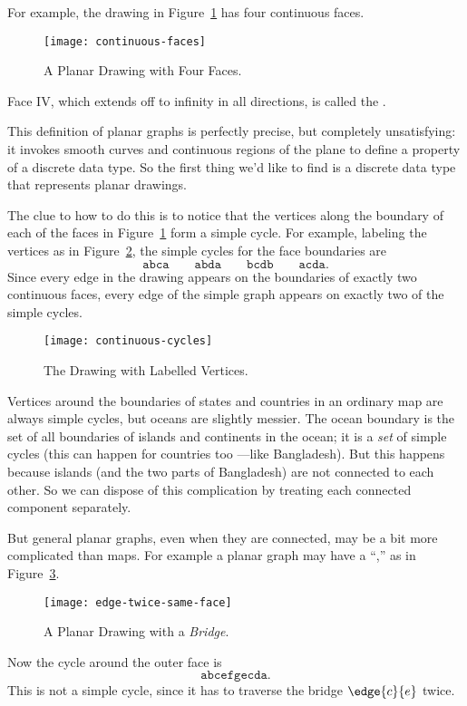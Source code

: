 For example, the drawing in Figure~\ref{fig:continuous-faces} has four
continuous faces.
\begin{figure}[h]
\centering \texttt{[image: continuous-faces]}
\caption{A Planar Drawing with Four Faces.}
\label{fig:continuous-faces}
\end{figure}
Face IV, which extends off to infinity in all directions, is called the
.

This definition of planar graphs is perfectly precise, but completely
unsatisfying: it invokes smooth curves and continuous regions of the plane
to define a property of a discrete data type.  So the first thing we'd
like to find is a discrete data type that represents planar drawings.

The clue to how to do this is to notice that the vertices along the
boundary of each of the faces in Figure~\ref{fig:continuous-faces} form a
simple cycle.  For example, labeling the vertices as in
Figure~\ref{fig:continuous-cycles}, the simple cycles for the face
boundaries are
\[
\mathtt{abca}\qquad \mathtt{abda}\qquad \mathtt{bcdb}\qquad \mathtt{acda}.
\]
Since every edge in the drawing appears on the boundaries of exactly two
continuous faces, every edge of the simple graph appears on exactly two of
the simple cycles.

\begin{figure}
\centering \texttt{[image: continuous-cycles]}
\caption{The Drawing with Labelled Vertices.}
\label{fig:continuous-cycles}
\end{figure}

Vertices around the boundaries of states and countries in an ordinary map
are always simple cycles, but oceans are slightly messier.  The ocean
boundary is the set of all boundaries of islands and continents in the
ocean; it is a \emph{set} of simple cycles (this can happen for countries
too ---like Bangladesh).  But this happens because islands (and the two
parts of Bangladesh) are not connected to each other.  So we can dispose
of this complication by treating each connected component separately.

But general planar graphs, even when they are connected, may be a bit more
complicated than maps.  For example a planar graph may have a
``,'' as in Figure~\ref{fig:bridge}.
\begin{figure}[h]
\centering \texttt{[image: edge-twice-same-face]}
\caption{A Planar Drawing with a \emph{Bridge}.}
\label{fig:bridge}
\end{figure}
Now the cycle around the outer face is
\[
\mathtt{abcefgecda}.
\]
This is not a simple cycle, since it has to traverse the bridge
$\edge{c}{e}$ twice.

